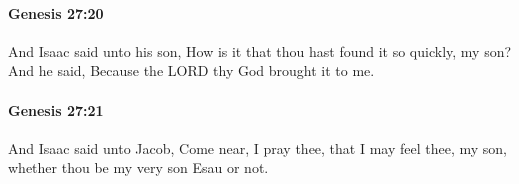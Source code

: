 		\paragraph{Genesis 27:20} %
			\label{GENESIS-27-20}

			And Isaac said unto his son, How is it that thou hast found it so quickly, my son? And he said, Because the LORD thy God brought it to me.


		\paragraph{Genesis 27:21} %
			\label{GENESIS-27-21}

			And Isaac said unto Jacob, Come near, I pray thee, that I may feel thee, my son, whether thou be my very son Esau or not.


